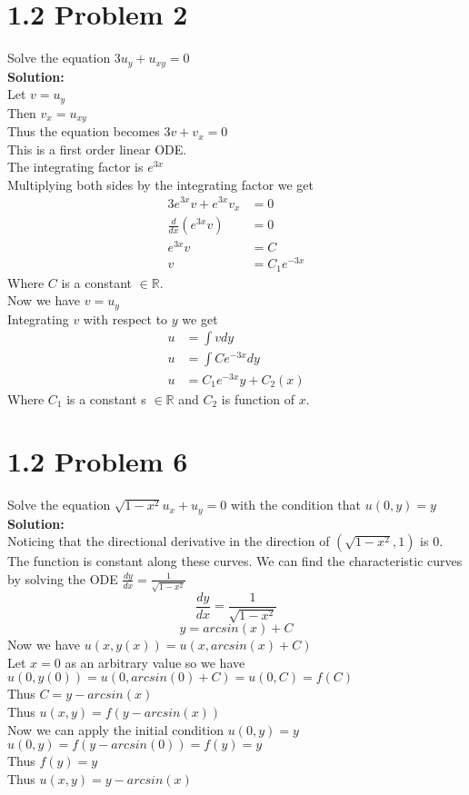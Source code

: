 \documentclass{article}
\begin{document}
\section*{1.2 Problem 2}
Solve the equation $3u_y + u_{xy} = 0$\\
\textbf{Solution:}\\
Let $v = u_y$\\
Then $v_x = u_{xy}$\\
Thus the equation becomes $3v + v_x = 0$\\
This is a first order linear ODE.\\
The integrating factor is $e^{3x}$\\
Multiplying both sides by the integrating factor we get\\
\begin{align*}
    3e^{3x}v + e^{3x}v_x &= 0\\
    \frac{d}{dx}(e^{3x}v) &= 0\\
    e^{3x}v &= C\\
    v &= C_1e^{-3x}
\end{align*}
Where $C$ is a constant $\in \mathds{R}$.\\
Now we have $v = u_y$\\
Integrating $v$ with respect to $y$ we get\\
\begin{align*}
    u &= \int v dy\\
    u &= \int Ce^{-3x} dy\\
    u &= C_1e^{-3x}y + C_2(x)
\end{align*}
Where $C_1$ is a constant s $\in \mathds{R}$ and $C_2$ is function of $x$.\\


\section*{1.2 Problem 6}
Solve the equation $\sqrt{1 - x^2}u_x + u_y = 0$ with the condition that $u(0,y) = y$\\
\textbf{Solution:}\\
Noticing that the directional derivative in the direction of $(\sqrt{1 - x^2}, 1)$ is 0. The function is constant along these curves. We can find the characteristic curves by solving the ODE $\frac{dy}{dx} = \frac{1}{\sqrt{1 - x^2}}$\\

$$\frac{dy}{dx} = \frac{1}{\sqrt{1-x^2}}$$
$$y = arcsin(x) + C$$
Now we have $u(x, y(x)) = u(x, arcsin(x) + C)$\\
Let $x=0$ as an arbitrary value so we have $u(0, y(0)) = u(0, arcsin(0) + C) = u(0, C) = f(C)$\\
Thus $C = y - arcsin(x)$\\ 
Thus $u(x, y) = f(y - arcsin(x))$\\
Now we can apply the initial condition $u(0, y) = y$\\
$u(0, y) = f(y - arcsin(0)) = f(y) = y$\\
Thus $f(y) = y$\\
Thus $u(x, y) = y - arcsin(x)$\\
\end{document}
